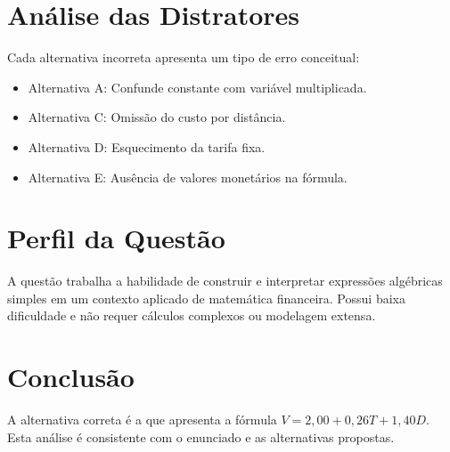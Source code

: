 \documentclass{article}
\begin{document}
\section{Análise das Distratores}
Cada alternativa incorreta apresenta um tipo de erro conceitual:
\begin{itemize}
  \item Alternativa A: Confunde constante com variável multiplicada.
  \item Alternativa C: Omissão do custo por distância.
  \item Alternativa D: Esquecimento da tarifa fixa.
  \item Alternativa E: Ausência de valores monetários na fórmula.
\end{itemize}

\section{Perfil da Questão}
A questão trabalha a habilidade de construir e interpretar expressões algébricas simples em um contexto aplicado de matemática financeira. Possui baixa dificuldade e não requer cálculos complexos ou modelagem extensa.

\section{Conclusão}
A alternativa correta é a que apresenta a fórmula $V = 2,00 + 0,26T + 1,40D$.
Esta análise é consistente com o enunciado e as alternativas propostas.
\end{document}
